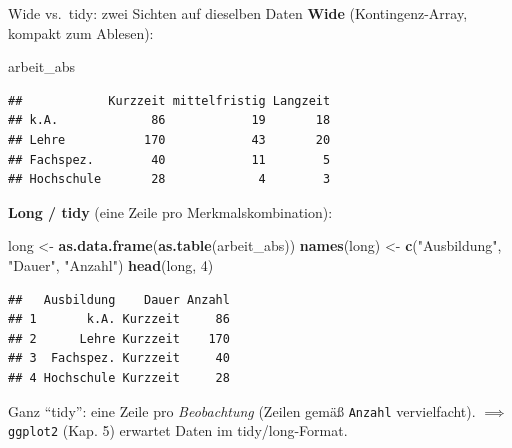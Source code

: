 \documentclass[
  10pt,
  ignorenonframetext,
]{beamer}
\newenvironment{Shaded}{\begin{snugshade}}{\end{snugshade}}
\newcommand{\DecValTok}[1]{\textcolor[rgb]{0.00,0.00,0.81}{#1}}
\newcommand{\FunctionTok}[1]{\textcolor[rgb]{0.13,0.29,0.53}{\textbf{#1}}}
\newcommand{\NormalTok}[1]{#1}
\newcommand{\OtherTok}[1]{\textcolor[rgb]{0.56,0.35,0.01}{#1}}
\newcommand{\StringTok}[1]{\textcolor[rgb]{0.31,0.60,0.02}{#1}}
\begin{document}
\begin{frame}[fragile]{Wide vs.~tidy: zwei Sichten auf dieselben Daten}
\protect\hypertarget{wide-vs.-tidy-zwei-sichten-auf-dieselben-daten}{}
\textbf{Wide} (Kontingenz-Array, kompakt zum Ablesen):

\scriptsize

\begin{Shaded}
\begin{Highlighting}[]
\NormalTok{arbeit\_abs}
\end{Highlighting}
\end{Shaded}

\begin{verbatim}
##            Kurzzeit mittelfristig Langzeit
## k.A.             86            19       18
## Lehre           170            43       20
## Fachspez.        40            11        5
## Hochschule       28             4        3
\end{verbatim}

\normalsize

\textbf{Long / tidy} (eine Zeile pro Merkmalskombination):

\scriptsize

\begin{Shaded}
\begin{Highlighting}[]
\NormalTok{long }\OtherTok{\textless{}{-}} \FunctionTok{as.data.frame}\NormalTok{(}\FunctionTok{as.table}\NormalTok{(arbeit\_abs))}
\FunctionTok{names}\NormalTok{(long) }\OtherTok{\textless{}{-}} \FunctionTok{c}\NormalTok{(}\StringTok{"Ausbildung"}\NormalTok{, }\StringTok{"Dauer"}\NormalTok{, }\StringTok{"Anzahl"}\NormalTok{)}
\FunctionTok{head}\NormalTok{(long, }\DecValTok{4}\NormalTok{)}
\end{Highlighting}
\end{Shaded}

\begin{verbatim}
##   Ausbildung    Dauer Anzahl
## 1       k.A. Kurzzeit     86
## 2      Lehre Kurzzeit    170
## 3  Fachspez. Kurzzeit     40
## 4 Hochschule Kurzzeit     28
\end{verbatim}

\normalsize

\footnotesize

Ganz ``tidy'': eine Zeile pro \emph{Beobachtung} (Zeilen gemäß
\texttt{Anzahl} vervielfacht). \(\implies\) \texttt{ggplot2} (Kap. 5)
erwartet Daten im tidy/long-Format.
\end{frame}
\end{document}
